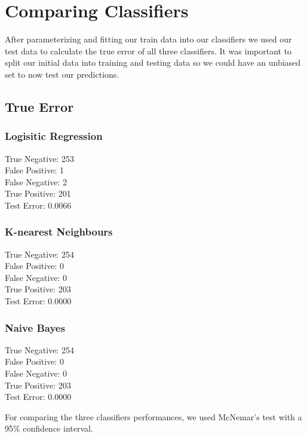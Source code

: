 \documentclass[a4paper]{article}
\newcommand\tab[1][1cm]{\hspace*{#1}}
\begin{document}
\section{Comparing Classifiers}

After parameterizing and fitting our train data into our classifiers we used our test data to calculate the true error of all
three classifiers.
It was important to split our initial data into training and testing data so we could have an unbiased set to now test our predictions.

\subsection{True Error}

\subsubsection{Logisitic Regression}
	\tab True Negative: 253\\
        	\tab False Positive: 1\\
        	\tab False Negative: 2\\
        	\tab True Positive: 201\\
        	\tab Test Error: 0.0066

\subsubsection{K-nearest Neighbours}
	\tab True Negative: 254\\
        	\tab False Positive: 0\\
        	\tab False Negative: 0\\
        	\tab True Positive: 203\\
        	\tab Test Error: 0.0000

\subsubsection{Naive Bayes}
        \tab True Negative: 254\\
        \tab False Positive: 0\\
        \tab False Negative: 0\\
        \tab True Positive: 203\\
        \tab Test Error: 0.0000

\bigbreak
For comparing the three classifiers performances, we used McNemar's test with a 95\% confidence interval.
\end{document}
